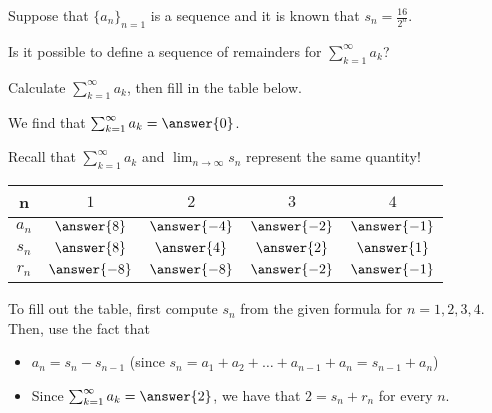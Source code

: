 \documentclass{ximera}
\author{Jim Talamo}
\begin{document}
\begin{exercise}

Suppose that $\{a_n\}_{n=1}$ is a sequence and it is known that $s_n = \frac{16}{2^n}$.

Is it possible to define a sequence of remainders for $\sum_{k=1}^{\infty} a_k$?

\begin{multipleChoice}
\end{multipleChoice}

\begin{exercise}
Calculate $\sum_{k=1}^{\infty} a_k$, then fill in the table below.

We find that $\sum_{k=1}^{\infty} a_k = \answer{0}$.

\begin{hint}
Recall that $\sum_{k=1}^{\infty} a_k$ and $\lim_{n \to \infty} s_n$ represent the same quantity!
\end{hint}

\begin{center}
\begin{tabular}{c | c | c | c | c }
n& $1$ & $2$ & $3$ & $4$ \\ [2 ex]
\hline
$a_n$ & $ \answer{8}$ &$ \answer{-4}$ & $ \answer{-2}$ & $ \answer{-1}$  \\ [2 ex]
\hline
$s_n$ & $ \answer{8}$ &$ \answer{4}$ & $ \answer{2}$ & $ \answer{1}$  \\ [2 ex]
\hline
$r_n$ & $ \answer{-8}$ & $ \answer{-8}$ & $ \answer{-2}$ & $ \answer{-1}$ 
\end{tabular}
\end{center}

\begin{hint}
To fill out the table, first compute $s_n$ from the given formula for $n=1,2,3,4$.  Then, use the fact that

\begin{itemize}
\item $a_n = s_n-s_{n-1}$ (since $s_n = a_1+a_2+\ldots+a_{n-1}+a_n = s_{n-1}+a_n$)
\item Since  $\sum_{k=1}^{\infty} a_k = \answer{2}$, we have that $2=s_n+r_n$ for every $n$.
\end{itemize}
\end{hint}

\end{exercise}
\end{exercise}
\end{document}
